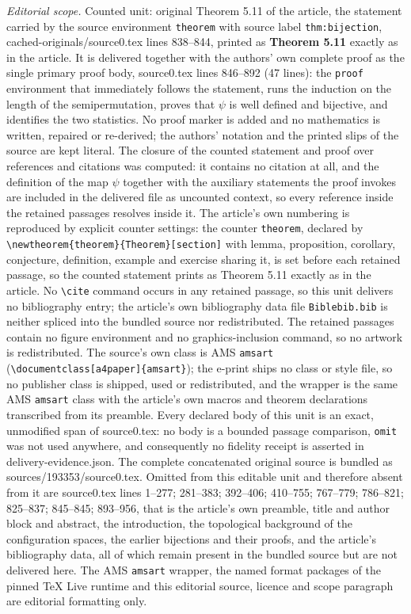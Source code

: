\documentclass[10pt,a4paper]{amsart}
\theoremstyle{definition}
\theoremstyle{remark}
\numberwithin{equation}{section}
\begin{document}
\noindent\textit{Editorial scope.} Counted unit: original Theorem 5.11 of the article, the statement carried by the source environment \texttt{theorem} with source label \texttt{thm:bijection}, cached-originals/source0.tex lines 838--844, printed as \textbf{Theorem 5.11} exactly as in the article. It is delivered together with the authors' own complete proof as the single primary proof body, source0.tex lines 846--892 (47 lines): the \texttt{proof} environment that immediately follows the statement, runs the induction on the length of the semipermutation, proves that $\psi$ is well defined and bijective, and identifies the two statistics. No proof marker is added and no mathematics is written, repaired or re-derived; the authors' notation and the printed slips of the source are kept literal. The closure of the counted statement and proof over references and citations was computed: it contains no citation at all, and the definition of the map $\psi$ together with the auxiliary statements the proof invokes are included in the delivered file as uncounted context, so every reference inside the retained passages resolves inside it. The article's own numbering is reproduced by explicit counter settings: the counter \texttt{theorem}, declared by \texttt{\textbackslash newtheorem\{theorem\}\{Theorem\}[section]} with lemma, proposition, corollary, conjecture, definition, example and exercise sharing it, is set before each retained passage, so the counted statement prints as Theorem 5.11 exactly as in the article. No \texttt{\textbackslash cite} command occurs in any retained passage, so this unit delivers no bibliography entry; the article's own bibliography data file \texttt{Biblebib.bib} is neither spliced into the bundled source nor redistributed. The retained passages contain no figure environment and no graphics-inclusion command, so no artwork is redistributed. The source's own class is AMS \texttt{amsart} (\texttt{\textbackslash documentclass[a4paper]\{amsart\}}); the e-print ships no class or style file, so no publisher class is shipped, used or redistributed, and the wrapper is the same AMS \texttt{amsart} class with the article's own macros and theorem declarations transcribed from its preamble. Every declared body of this unit is an exact, unmodified span of source0.tex: no body is a bounded passage comparison, \texttt{omit} was not used anywhere, and consequently no fidelity receipt is asserted in delivery-evidence.json. The complete concatenated original source is bundled as sources/193353/source0.tex. Omitted from this editable unit and therefore absent from it are source0.tex lines 1--277; 281--383; 392--406; 410--755; 767--779; 786--821; 825--837; 845--845; 893--956, that is the article's own preamble, title and author block and abstract, the introduction, the topological background of the configuration spaces, the earlier bijections and their proofs, and the article's bibliography data, all of which remain present in the bundled source but are not delivered here. The AMS \texttt{amsart} wrapper, the named format packages of the pinned TeX Live runtime and this editorial source, licence and scope paragraph are editorial formatting only.\par\smallskip
\end{document}
